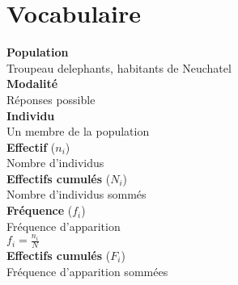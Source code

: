 \chapter{Vocabulaire}

\textbf{Population} \\
Troupeau delephants, habitants de Neuchatel \\

\textbf{Modalité} \\
Réponses possible \\

\textbf{Individu} \\
Un membre de la population \\

\textbf{Effectif} ($n_i$) \\
Nombre d'individus \\

\textbf{Effectifs cumulés} ($N_i$) \\
Nombre d'individus sommés \\

\textbf{Fréquence} ($f_i$) \\
Fréquence d'apparition \\
$f_i = \frac{n_i}{N}$ \\

\textbf{Effectifs cumulés} ($F_i$) \\
Fréquence d'apparition sommées \\

